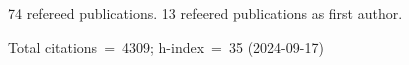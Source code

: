 74 refereed publications. 13 refeered publications as first author.

Total citations~=~4309; h-index~=~35 (2024-09-17)